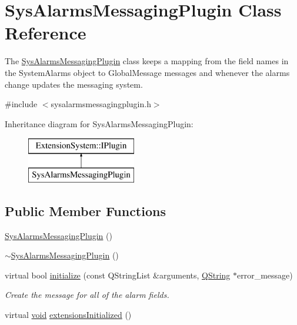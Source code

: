 \hypertarget{class_sys_alarms_messaging_plugin}{\section{\-Sys\-Alarms\-Messaging\-Plugin \-Class \-Reference}
\label{class_sys_alarms_messaging_plugin}
}


\-The \hyperlink{class_sys_alarms_messaging_plugin}{\-Sys\-Alarms\-Messaging\-Plugin} class keeps a mapping from the field names in the \-System\-Alarms object to \-Global\-Message messages and whenever the alarms change updates the messaging system.  




{\ttfamily \#include $<$sysalarmsmessagingplugin.\-h$>$}

\-Inheritance diagram for \-Sys\-Alarms\-Messaging\-Plugin\-:\begin{figure}[H]
\begin{center}
\leavevmode
\includegraphics[height=2.000000cm]{class_sys_alarms_messaging_plugin}
\end{center}
\end{figure}
\subsection*{\-Public \-Member \-Functions}
\begin{DoxyCompactItemize}
\item 
\hyperlink{group___system_ga28d933c66393f5dcb0a9f5be71c29476}{\-Sys\-Alarms\-Messaging\-Plugin} ()
\item 
\hyperlink{group___system_gadb9f2fd8f551a876369ad14edccafb77}{$\sim$\-Sys\-Alarms\-Messaging\-Plugin} ()
\item 
virtual bool \hyperlink{group___system_gaee946a3db8f69ee44247462593349d71}{initialize} (const \-Q\-String\-List \&arguments, \hyperlink{group___u_a_v_objects_plugin_gab9d252f49c333c94a72f97ce3105a32d}{\-Q\-String} $\ast$error\-\_\-message)
\begin{DoxyCompactList}\small\item\em \-Create the message for all of the alarm fields. \end{DoxyCompactList}\item 
virtual \hyperlink{group___u_a_v_objects_plugin_ga444cf2ff3f0ecbe028adce838d373f5c}{void} \hyperlink{group___system_gafbeee237df9ed93b1f831cf2f8770055}{extensions\-Initialized} ()
\end{DoxyCompactItemize}


